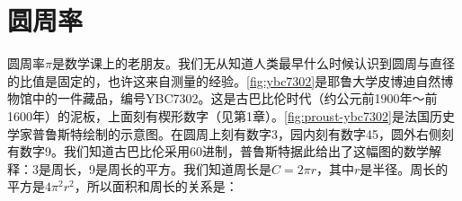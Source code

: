 \documentclass[b5paper]{ctexart}
\begin{document}
\section{圆周率}
圆周率$\pi$是数学课上的老朋友。我们无从知道人类最早什么时候认识到圆周与直径的比值是固定的，也许这来自测量的经验。\cref{fig:ybc7302}是耶鲁大学皮博迪自然博物馆中的一件藏品，编号YBC7302。这是古巴比伦时代（约公元前1900年～前1600年）的泥板，上面刻有楔形数字（见第1章）。\cref{fig:proust-ybc7302}是法国历史学家普鲁斯特绘制的示意图\cite{Proust-2016}。在圆周上刻有数字3，园内刻有数字45，圆外右侧刻有数字9。我们知道古巴比伦采用60进制，普鲁斯特据此给出了这幅图的数学解释：3是周长，9是周长的平方。我们知道周长是$C = 2\pi r$，其中$r$是半径。周长的平方是$4\pi^2 r^2$，所以面积和周长的关系是：

\begin{figure}[htbp]
 \centering
\end{figure}
\end{document}
